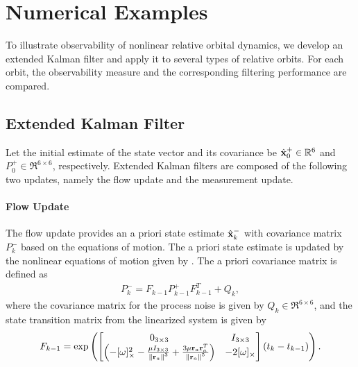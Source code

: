 \section{Numerical Examples}



To illustrate observability of nonlinear relative orbital dynamics, we develop an extended Kalman
filter and apply it to several types of relative orbits. For each orbit, the observability measure and the corresponding filtering performance are compared. 

\subsection{Extended Kalman Filter}

Let the initial estimate of the state vector and its covariance be $\hat {\mathbf{x}}_0^+\in\mathbb{R}^6$ and $P^+_0\in\Re^{6\times 6}$, respectively. Extended Kalman filters are composed of the following two updates, namely the flow update and the measurement update. 

\paragraph{Flow Update}
The flow update provides an a priori state estimate $\hat {\mathbf{x}}^-_k$ with covariance matrix $P^-_k$ based on the equations of motion. The a priori state estimate is updated by the nonlinear equations of motion given by . The a priori covariance matrix is defined as
\begin{align}
P^-_k=F_{k-1}P^+_{k-1}F_{k-1}^T+Q_k,
\end{align}
where the covariance matrix for the process noise is given by $Q_k\in\Re^{6\times 6}$, and the state transition matrix from the linearized system is given by
\begin{align}
F_{k-1}=\exp\left(
\begin{bmatrix}
0_{3\times3} & I_{3\times3} \\
\left(-[\omega]_\times^2-\frac{\mu I_{3\times3}}{\left\| \mathbf{r}_a \right\|^3}+\frac{3\mu \mathbf{r}_a \mathbf{r}_a^T}{\left\| \mathbf{r}_a \right\|^5}\right) & -2[\omega]_\times
\end{bmatrix}
(t_k-t_{k-1})\right).
\end{align}

